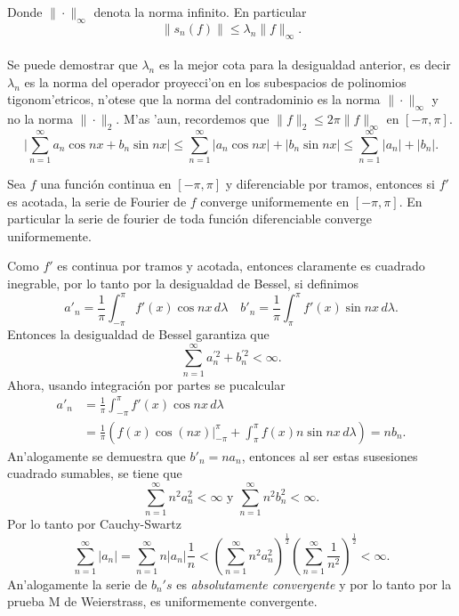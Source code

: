 \documentclass[main.tex]{subfiles}
\begin{document}
    Donde \(\|\cdot\|_{\infty}\) denota la norma infinito. En particular
    \[
      \|s_{n}(f)\|\leq\lambda_{n}\|f\|_{\infty}.
    \]
    \QED\\
    \obs Se puede demostrar que \(\lambda_{n}\) es la mejor cota para la desigualdad anterior, es decir \(\lambda_{n}\) es la norma del operador proyecci'on en los subespacios de polinomios tigonom'etricos, n'otese que la norma del contradominio es la norma \(\|\cdot\|_{\infty}\) y no la norma \(\|\cdot\|_{2}\). M'as 'aun, recordemos que \(\|f\|_2\leq2\pi\|f\|_{\infty}\) en \([-\pi,\pi]\).\\
    \obs
    \[
      \bigg|\sum_{n=1}^{\infty}a_{n}\cos nx+b_{n}\sin nx\bigg|\leq\sum_{n=1}^{\infty}|a_{n}\cos nx|+|b_{n}\sin nx|\leq\sum_{n=1}^{\infty}|a_{n}|+|b_{n}|.
    \]
    \begin{teorema}
      Sea \(f\) una funci\'on continua en \([-\pi,\pi]\) y diferenciable por tramos, entonces si \(f'\) es acotada, la serie de Fourier de \(f\) converge uniformemente en \([-\pi,\pi]\). En particular la serie de fourier de toda funci\'on diferenciable converge uniformemente.
    \end{teorema}
    \dem Como \(f'\) es continua por tramos y acotada, entonces claramente es cuadrado inegrable, por lo tanto por la desigualdad de Bessel, si definimos
    \[
      a'_n=\frac{1}{\pi}\int_{-\pi}^{\pi}f'(x)\cos nx\,d\lambda\quad b'_n=\frac{1}{\pi}\int_{\pi}^{\pi} f'(x) \sin nx\,d\lambda.
    \]
    Entonces la desigualdad de Bessel garantiza que
    \[
      \sum_{n=1}^{\infty}a_{n}^{'2}+b_{n}^{'2}<\infty.
    \]
    Ahora, usando integraci\'on por partes se pucalcular
    \begin{align*}
      a'_n&=\frac{1}{\pi}\int_{-\pi}^{\pi}f'(x)\cos nx\,d\lambda\\
            &=\frac{1}{\pi}\left(f(x)\cos(nx)\bigg|_{-\pi}^{\pi}+\int_{\pi}^{\pi} f(x)n\sin nx\,d\lambda\right)=nb_{n}.
    \end{align*}
    An'alogamente se demuestra que \(b'_{n}=na_{n}\), entonces al ser estas susesiones cuadrado sumables, se tiene que
    \[
      \sum_{n=1}^{\infty}n^{2}a_{n}^{2}<\infty\text{ y }\sum_{n=1}^{\infty}n^{2}b_{n}^{2}<\infty.
    \]
    Por lo tanto por Cauchy-Swartz
    \[
      \sum_{n=1}^{\infty}|a_{n}|=\sum_{n=1}^{\infty}n|a_{n}|\frac{1}{n}<
      \left(\sum_{n=1}^{\infty}n^{2}a_{n}^{2}\right)^{\frac{1}{2}}\left(\sum_{n=1}^{\infty}\frac{1}{n^{2}}\right)^{\frac{1}{2}}<\infty.
    \]
    An'alogamente la serie de \(b_{n}'s\) es \emph{absolutamente convergente} y por lo tanto por la prueba M de Weierstrass, es uniformemente convergente.\\
    \QED
\end{document}
